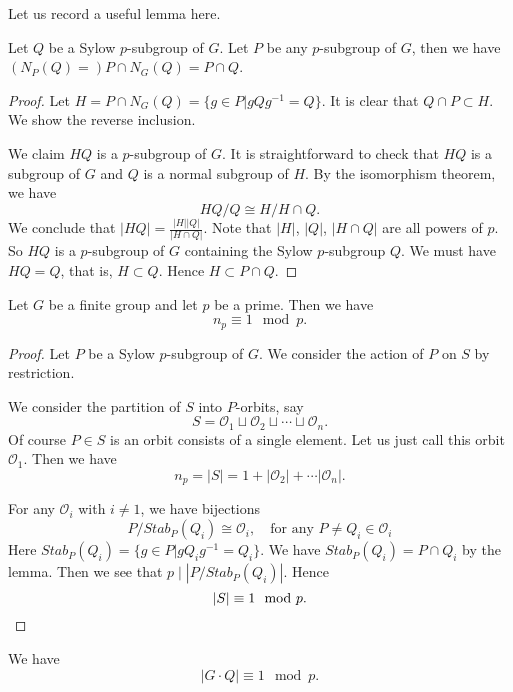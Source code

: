 Let us record a useful lemma here.
\begin{lem}
    Let $Q$ be a Sylow $p$-subgroup of $G$. Let $P$ be any $p$-subgroup of $G$, then we have $(N_P(Q) =) P \cap N_G(Q) = P \cap Q$.
\end{lem}

\begin{proof}
    Let $H = P \cap N_G(Q) = \{g \in P \vert gQg^{-1} = Q\}$. It is clear that $Q \cap P \subset H$. We show the reverse inclusion.

    We claim $HQ $ is a $p$-subgroup of $G$. It is straightforward to check that $HQ$ is a subgroup of $G$ and $Q$ is a normal subgroup of $H$. By the isomorphism theorem, we have
    \[
        HQ /Q \cong H/ H\cap Q.
    \]
    We conclude that $|HQ| = \frac{|H||Q|}{|H\cap Q|}$. Note that $|H|$, $|Q|$, $|H\cap Q|$ are all powers of $p$. So $HQ$ is a $p$-subgroup of $G$ containing the Sylow $p$-subgroup $Q$. We must have $HQ =Q$, that is, $H \subset Q$. Hence $H \subset P \cap Q$.
\end{proof}



\begin{prop}
    Let $G$ be a finite group and let $p$ be a prime. Then we have
    \[
        n_p \equiv 1 \mod p.
    \]
\end{prop}
\begin{proof}
    Let $P$ be a Sylow $p$-subgroup of $G$. We consider the action of $P$ on $S$ by restriction.

    We consider the partition of $S$ into $P$-orbits, say
    \[
        S = \mathcal{O}_1 \sqcup \mathcal{O}_2 \sqcup \cdots \sqcup \mathcal{O}_n.
    \]
    Of course $P \in S$ is an orbit consists of a single element. Let us just call this orbit $\mathcal{O}_1$. Then we have
    \[
        n_p=|S| = 1 + |\mathcal{O}_2| + \cdots |\mathcal{O}_n|.
    \]



    For any $ \mathcal{O}_i$ with $i \neq 1$, we have bijections
    \[
        P/ Stab_P(Q_i) \cong  \mathcal{O}_i, \quad \text{for any } P \neq Q_i \in \mathcal{O}_i
    \]
    Here $Stab_P(Q_i) = \{g \in P \vert g Q_ig^{-1} = Q_i\}$. We have $Stab_P(Q_i) = P\cap Q_i$ by the lemma. Then we see that $ p \mid |P/ Stab_P(Q_i)|$. Hence
    \[
        |S| \equiv 1 \mod p. \qedhere
    \]
\end{proof}

\begin{cor}\label{cor:SylowCor}
    We have
    \[
        | G \cdot Q | \equiv 1 \mod p.
    \]
\end{cor}

